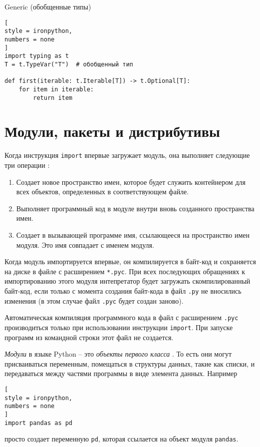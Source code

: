 \documentclass[%
	11pt,
	a4paper,
	utf8,
		]{article}
\begin{document}
Generic (обобщенные типы)
\begin{lstlisting}[
style = ironpython,
numbers = none
]
import typing as t
T = t.TypeVar("T")  # обобщенный тип

def first(iterable: t.Iterable[T]) -> t.Optional[T]:
    for item in iterable:
        return item
\end{lstlisting}


\section{Модули, пакеты и дистрибутивы}

Когда инструкция \texttt{import} впервые загружает модуль, она выполняет следующие три операции \cite[]{beazley:python-2010}:
\begin{enumerate}
	\item Создает новое пространство имен, которое будет служить контейнером для всех объектов, определенных в соответствующем файле.
	
	\item Выполняет программный код в модуле внутри вновь созданного пространства имен.
	
	\item Создает в вызывающей программе имя, ссылающееся на пространство имен модуля. Это имя совпадает с именем модуля.
\end{enumerate}

Когда модуль импортируется впервые, он компилируется в байт-код и сохраняется на диске в файле с расширением \texttt{*.pyc}. При всех последующих обращениях к импортированию этого модуля интепретатор будет загружать скомпилированный байт-код, если только с момента создания байт-кода в файл \texttt{.py} не вносились изменения (в этом случае файл \texttt{.pyc} будет создан заново).

Автоматическая компиляция программного кода в файл с расширением \texttt{.pyc} производиться только при использовании инструкции \texttt{import}. При запуске программ из командной строки этот файл не создается.

\emph{Модули} в языке Python -- это \emph{объекты первого класса} \cite[]{beazley:python-2010}. То есть они могут присваиваться переменным, помещаться в структуры данных, такие как списки, и передаваться между частями программы в виде элемента данных. Например
\begin{lstlisting}[
style = ironpython,
numbers = none	
]
import pandas as pd
\end{lstlisting}
просто создает переменную \texttt{pd}, которая ссылается на объект модуля \texttt{pandas}.
\end{document}
